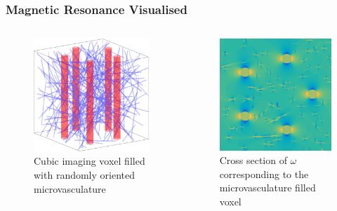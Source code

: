 \begin{frame}
\frametitle{Magnetic Resonance Visualised}

\centering
\begin{columns}
\begin{column}{.5\textwidth}
\begin{figure}
  \includegraphics[height=0.8\textwidth]{figures/voxelgeo}
  \caption{Cubic imaging voxel filled with randomly oriented microvasculature}
\end{figure}
\end{column}
\begin{column}{.5\textwidth}
\begin{figure}
  \includegraphics[height=0.8\textwidth]{figures/domega}
  \caption{Cross section of $\omega$ corresponding to the microvasculature filled voxel}
\end{figure}
\end{column}
\end{columns}


\end{frame}
